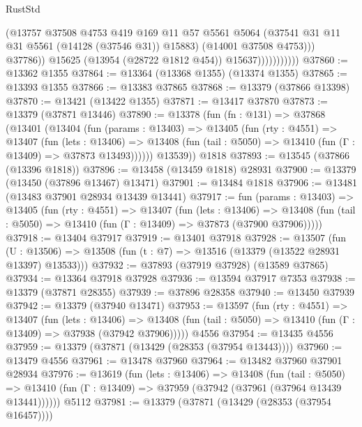 \begin{lexlean}{RustStd}
\begin{coremodule}
                                (@13757
                                  @37508
                                  @4753
                                  @419
                                  @169
                                  @11
                                  @57
                                  @5561
                                  @5064
                                  (@37541 @31 @11 @31 @5561 (@14128 (@37546 @31)) @15883)
                                  (@14001 @37508 @4753)))
                              @37786))
                          @15625
                          (@13954 (@28722 @1812 @454))
                          @15637)))))))))))
@37860 := @13362 @1355
@37864 := @13364 (@13368 @1355) (@13374 @1355)
@37865 := @13393 @1355
@37866 := @13383 @37865
@37868 := @13379 (@37866 @13398)
@37870 := @13421 (@13422 @1355)
@37871 := @13417 @37870
@37873 := @13379 (@37871 @13446)
@37890 := @13378
    (fun (fn : @131) =>
    @37868
      (@13401
        (@13404
          (fun (params : @13403) =>
          @13405
            (fun (rty : @4551) =>
            @13407
              (fun (lets : @13406) =>
              @13408 (fun (tail : @5050) => @13410 (fun (Γ : @13409) => @37873 @13493))))))
        @13539))
    @1818
@37893 := @13545 (@37866 (@13396 @1818))
@37896 := @13458 (@13459 @1818) @28931
@37900 := @13379 (@13450 (@37896 @13467) @13471)
@37901 := @13484 @1818
@37906 := @13481 (@13483 @37901 @28934 @13439 @13441)
@37917 := fun (params : @13403) =>
  @13405
    (fun (rty : @4551) =>
    @13407
      (fun (lets : @13406) =>
      @13408 (fun (tail : @5050) => @13410 (fun (Γ : @13409) => @37873 (@37900 @37906)))))
@37918 := @13404 @37917
@37919 := @13401 @37918
@37928 := @13507
    (fun (U : @13506) => @13508 (fun (t : @7) => @13516 (@13379 (@13522 @28931 @13397) @13533)))
@37932 := @37893 (@37919 @37928) (@13589 @37865)
@37934 := @13364 @37918 @37928
@37936 := @13594 @37917 @7353
@37938 := @13379 (@37871 @28355)
@37939 := @37896 @28358
@37940 := @13450 @37939
@37942 := @13379 (@37940 @13471)
@37953 := @13597
    (fun (rty : @4551) =>
    @13407
      (fun (lets : @13406) =>
      @13408 (fun (tail : @5050) => @13410 (fun (Γ : @13409) => @37938 (@37942 @37906)))))
    @4556
@37954 := @13435 @4556
@37959 := @13379 (@37871 (@13429 (@28353 (@37954 @13443))))
@37960 := @13479 @4556
@37961 := @13478 @37960
@37964 := @13482 @37960 @37901 @28934
@37976 := @13619
    (fun (lets : @13406) =>
    @13408
      (fun (tail : @5050) =>
      @13410 (fun (Γ : @13409) => @37959 (@37942 (@37961 (@37964 @13439 @13441))))))
    @5112
@37981 := @13379 (@37871 (@13429 (@28353 (@37954 @16457))))

\end{coremodule}
\end{lexlean}
